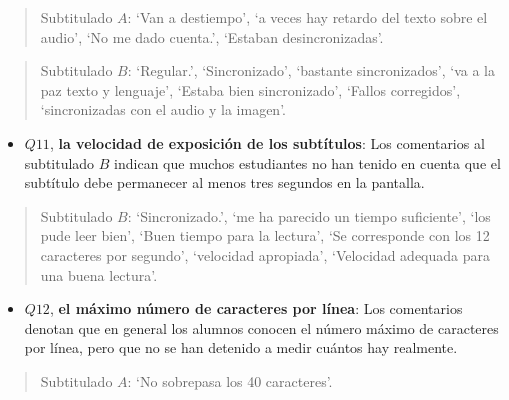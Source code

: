 \documentclass[
  12pt,
  a4paper,
  extrafontsizes,
  onecolumn,
  openright,
  table]{memoir}
\providecommand{\tightlist}{%
  \setlength{\itemsep}{0pt}\setlength{\parskip}{0pt}}\usepackage{longtable,booktabs,array}
\begin{document}
\small

\begin{quote}
Subtitulado \(A\): \enquote*{Van a destiempo}, \enquote*{a veces hay
retardo del texto sobre el audio}, \enquote*{No me dado cuenta.},
\enquote*{Estaban desincronizadas}.
\end{quote}

\normalsize

\small

\begin{quote}
Subtitulado \(B\): \enquote*{Regular.}, \enquote*{Sincronizado},
\enquote*{bastante sincronizados}, \enquote*{va a la paz texto y
lenguaje}, \enquote*{Estaba bien sincronizado}, \enquote*{Fallos
corregidos}, \enquote*{sincronizadas con el audio y la imagen}.
\end{quote}

\normalsize

\begin{itemize}
\tightlist
\item
  \(Q11\), \textbf{la velocidad de exposición de los subtítulos}: Los
  comentarios al subtitulado \(B\) indican que muchos estudiantes no han
  tenido en cuenta que el subtítulo debe permanecer al menos tres
  segundos en la pantalla.
\end{itemize}

\small

\begin{quote}
Subtitulado \(B\): \enquote*{Sincronizado.}, \enquote*{me ha parecido un
tiempo suficiente}, \enquote*{los pude leer bien}, \enquote*{Buen tiempo
para la lectura}, \enquote*{Se corresponde con los 12 caracteres por
segundo}, \enquote*{velocidad apropiada}, \enquote*{Velocidad adequada
para una buena lectura}.
\end{quote}

\normalsize

\begin{itemize}
\tightlist
\item
  \(Q12\), \textbf{el máximo número de caracteres por línea}: Los
  comentarios denotan que en general los alumnos conocen el número
  máximo de caracteres por línea, pero que no se han detenido a medir
  cuántos hay realmente.
\end{itemize}

\small

\begin{quote}
Subtitulado \(A\): \enquote*{No sobrepasa los 40 caracteres}.
\end{quote}
\end{document}
